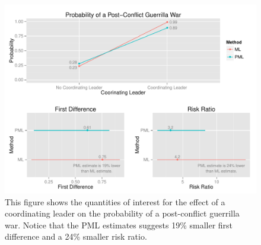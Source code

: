 \documentclass[12pt]{article}
\begin{document}
\begin{figure}[H]
\begin{center}
\includegraphics[width = \textwidth]{figs/weisiger-qis.pdf}
\caption{This figure shows the quantities of interest for the effect of a coordinating leader on the probability of a post-conflict guerrilla war. Notice that the PML estimates suggests 19\% smaller first difference and a 24\% smaller risk ratio.}\label{fig:weisiger-qis}
\end{center}
\end{figure}

\singlespace 
\newpage
\normalsize


%
\end{document}
